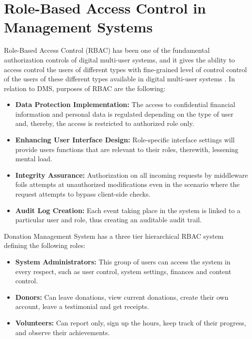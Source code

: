 \documentclass{thesis-library}
\begin{document}
\section{Role-Based Access Control in Management Systems}

Role-Based Access Control (RBAC) has been one of the fundamental authorization controls of digital multi-user systems, and it gives the ability to access control the users of different types with fine-grained level of control control of the users of these different types available in digital multi-user systems \cite{sandhu1996rbac}. In relation to DMS, purposes of RBAC are the following:

\begin{itemize}
    \item \textbf{Data Protection Implementation:} The access to confidential financial information and personal data is regulated depending on the type of user and, thereby, the access is restricted to authorized role only.
    \item \textbf{Enhancing User Interface Design:} Role-specific interface settings will provide users functions that are relevant to their roles, therewith, lessening mental load.
    \item \textbf{Integrity Assurance:} Authorization on all incoming requests by middleware foils attempts at unauthorized modifications even in the scenario where the request attempts to bypass client-side checks.
    \item \textbf{Audit Log Creation:} Each event taking place in the system is linked to a particular user and role, thus creating an auditable audit trail.
\end{itemize}

Donation Management System has a three tier hierarchical RBAC system defining the following roles:

\begin{itemize}
    \item \textbf{System Administrators:} This group of users can access the system in every respect, such as user control, system settings, finances and content control.
    \item \textbf{Donors:} Can leave donations, view current donations, create their own account, leave a testimonial and get receipts.
    \item \textbf{Volunteers:} Can report only, sign up the hours, keep track of their progress, and observe their achievements.
\end{itemize}
\end{document}
